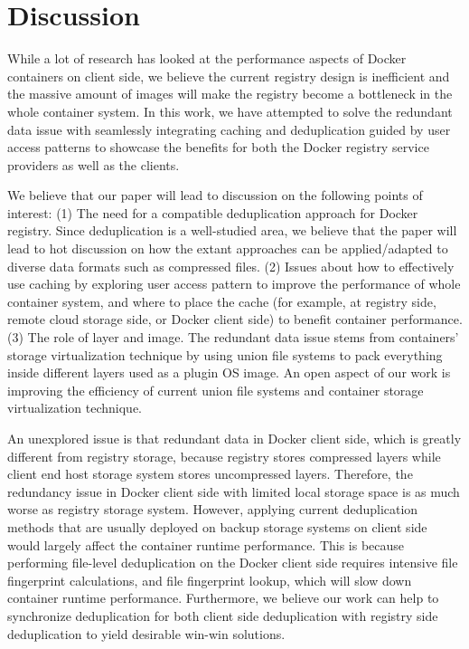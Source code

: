
\newpage
\section{Discussion}
\label{sec:discussion}
While a lot of research has looked at the performance aspects of Docker containers on client side,
we believe the current registry design is inefficient and 
the massive amount of images will make the registry become a bottleneck in the whole
container system.
In this work, we have attempted to solve the redundant data issue 
with seamlessly integrating caching and deduplication guided by user access patterns
to showcase the benefits for both the Docker registry service providers as well as the clients.

We believe that our paper will lead to discussion on the following points of interest:
(1) The need for a compatible deduplication approach for Docker registry.
Since deduplication is a well-studied area, we believe that the paper will lead to 
hot discussion on how the extant approaches can be applied/adapted
to diverse data formats such as compressed files.
(2) Issues about how to effectively use caching by exploring user access pattern to improve the performance of whole container system,
and where to place the cache (for example, at registry side, remote cloud storage side, or Docker client side)
to benefit container performance. 
(3) The role of layer and image.
The redundant data issue stems from containers' storage virtualization technique by using
union file systems to pack everything inside different layers used as a plugin OS image.
An open aspect of our work is improving 
the efficiency of current union file systems and container storage virtualization technique.

An unexplored issue is that redundant data in Docker client side, which is
greatly different from registry storage, 
because registry stores compressed layers
while client end host storage system stores uncompressed layers.
Therefore, the redundancy issue in Docker client side with limited local storage space is
 as much worse as registry storage system.
 However, applying current deduplication methods that are usually deployed on backup storage systems
  on
 client side would largely affect the container runtime performance. 
 This is because performing file-level deduplication on the Docker client side
 requires intensive file fingerprint calculations, and file fingerprint lookup, 
 which will slow down container runtime performance.
 Furthermore, we believe our work can help to synchronize deduplication for both
 client side deduplication with registry side deduplication
 to yield desirable win-win solutions.
 
